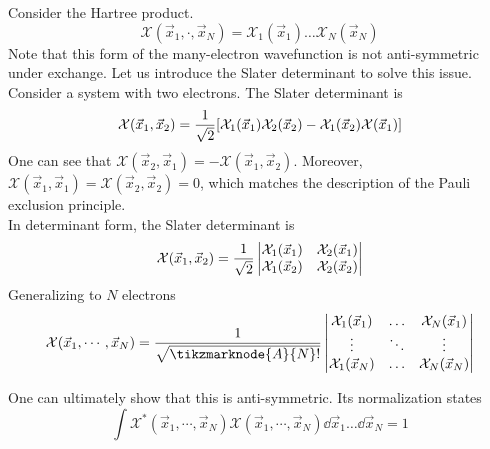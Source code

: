 \documentclass[12pt,a4paper,titlepage]{article}
\newcommand{\Chi}{\mathcal{X}} %
\begin{document}
Consider the Hartree product.
\begin{equation}
\Chi(\vec{x}_{1},\cdot,\vec{x}_{N})=\Chi_{1}(\vec{x}_{1})\ldots\Chi_{N}(\vec{x}_{N})
\end{equation}
Note that this form of the many-electron wavefunction is not anti-symmetric under exchange. Let us introduce the Slater determinant to solve this issue. Consider a system with two electrons. The Slater determinant is
\begin{equation}
\Chi(\vec{x}_{1},\vec{x}_{2})=\frac{1}{\sqrt{2}}\qty[\Chi_{1}(\vec{x}_{1})\Chi_{2}(\vec{x}_{2})-\Chi_{1}(\vec{x}_{2})\Chi(\vec{x}_{1})]
\end{equation}
One can see that $\Chi(\vec{x}_{2},\vec{x}_{1})=-\Chi(\vec{x}_{1},\vec{x}_{2})$. Moreover, $\Chi(\vec{x}_{1},\vec{x}_{1})=\Chi(\vec{x}_{2},\vec{x}_{2})=0$, which matches the description of the Pauli exclusion principle.\\

In determinant form, the Slater determinant is
\begin{equation}
\Chi(\vec{x}_{1},\vec{x}_{2})=\frac{1}{\sqrt{2}}\mdet{\Chi_{1}(\vec{x}_{1}) & \Chi_{2}(\vec{x}_{1})\\ \Chi_{1}(\vec{x}_{2}) & \Chi_{2}(\vec{x}_{2})}
\end{equation}
Generalizing to $N$ electrons
\begin{equation}
\Chi(\vec{x}_{1},\cdots,\vec{x}_{N})={\frac{1}{\sqrt{\tikzmarknode{A}{N}!}}}\mdet{\Chi_{1}(\vec{x}_{1}) & \ldots & \Chi_{N}(\vec{x}_{1})\\ \vdots & \ddots & \vdots\\ \Chi_{1}(\vec{x}_{N}) & \ldots & \Chi_{N}(\vec{x}_{N})}
\end{equation}

\newpage
One can ultimately show that this is anti-symmetric. Its normalization states
\begin{equation}
\int\Chi^{*}(\vec{x}_{1},\cdots,\vec{x}_{N})\Chi(\vec{x}_{1},\cdots,\vec{x}_{N})\dd{\vec{x}_{1}}\ldots\dd{\vec{x}_{N}}=1
\end{equation}
\end{document}
